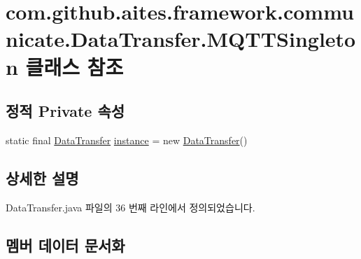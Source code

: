 \hypertarget{classcom_1_1github_1_1aites_1_1framework_1_1communicate_1_1_data_transfer_1_1_m_q_t_t_singleton}{}\section{com.\+github.\+aites.\+framework.\+communicate.\+Data\+Transfer.\+M\+Q\+T\+T\+Singleton 클래스 참조}
\label{classcom_1_1github_1_1aites_1_1framework_1_1communicate_1_1_data_transfer_1_1_m_q_t_t_singleton}
\subsection*{정적 Private 속성}
\begin{DoxyCompactItemize}
\item 
static final \mbox{\hyperlink{classcom_1_1github_1_1aites_1_1framework_1_1communicate_1_1_data_transfer}{Data\+Transfer}} \mbox{\hyperlink{classcom_1_1github_1_1aites_1_1framework_1_1communicate_1_1_data_transfer_1_1_m_q_t_t_singleton_a32890f0389eb47836baddb187a0c6950}{instance}} = new \mbox{\hyperlink{classcom_1_1github_1_1aites_1_1framework_1_1communicate_1_1_data_transfer}{Data\+Transfer}}()
\end{DoxyCompactItemize}


\subsection{상세한 설명}


Data\+Transfer.\+java 파일의 36 번째 라인에서 정의되었습니다.



\subsection{멤버 데이터 문서화}
\mbox{\label{classcom_1_1github_1_1aites_1_1framework_1_1communicate_1_1_data_transfer_1_1_m_q_t_t_singleton_a32890f0389eb47836baddb187a0c6950}} 
